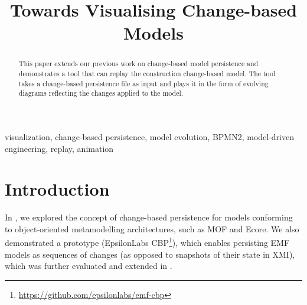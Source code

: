 \documentclass[conference]{IEEEtran}
\begin{document}
\title{Towards Visualising Change-based Models
}

\author{
}
\maketitle

\begin{abstract}
This paper extends our previous work on change-based model persistence and 
demonstrates a tool that can replay the construction change-based model. The tool 
takes a change-based persistence file as input and plays it 
in the form of evolving diagrams reflecting the changes applied to 
the model.


\end{abstract}

\begin{IEEEkeywords}
visualization, change-based persistence, model evolution, BPMN2, model-driven engineering,
replay, animation
\end{IEEEkeywords}

\section{Introduction}
\label{sec:introduction}
In \cite{DBLP:conf/models/YohannisKP17}, we explored the concept of change-based persistence for models conforming
to object-oriented metamodelling architectures, such as MOF and Ecore. 
We also demonstrated a prototype (EpsilonLabs CBP\footnote{\url{https://github.com/epsilonlabs/emf-cbp}}), which enables persisting EMF models 
as sequences of changes (as opposed to snapshots of their state in XMI), which was 
further evaluated and extended in 
\cite{yohannis2018towards,DBLP:conf/models/YohannisRPK18,yohannis2018efficient}.
\end{document}

